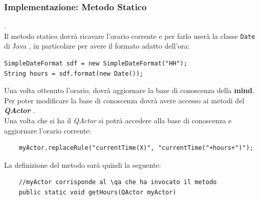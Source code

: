\documentclass{llncs}
\newcommand{\java}{\textsf{Java }}
\newcommand{\qa}{\textsf{\textit{QActor }}}
\begin{document}
\subsubsection{Implementazione: Metodo Statico} .
\label{ImplementazioneReq3MetodoStatico}
\vspace*{1ex}
\\
Il metodo statico dovr\`a ricavare l'orario corrente e per farlo user\`a la classe \texttt{Date} di \java, in particolare per avere il formato adatto dell'ora:\\
\begin{verbatim}
SimpleDateFormat sdf = new SimpleDateFormat("HH");
String hours = sdf.format(new Date());
\end{verbatim}
Una volta ottenuto l'orario, dovr\`a aggiornare la base di conoscenza della \textbf{mind}. Per poter modificare la base di conoscenza dovr\`a avere accesso ai metodi del \textbf{\qa}.\\
Una volta che si ha il \qa si potr\`a accedere alla base di conoscenza e aggiornare l'orario corrente:
\begin{verbatim}
    myActor.replaceRule("currentTime(X)", "currentTime("+hours+")");
\end{verbatim}
La definizione del metodo sar\`a quindi la seguente:
\begin{verbatim}
    //myActor corrisponde al \qa che ha invocato il metodo
    public static void getHours(QActor myActor) 
\end{verbatim}
\pagebreak
\end{document}
